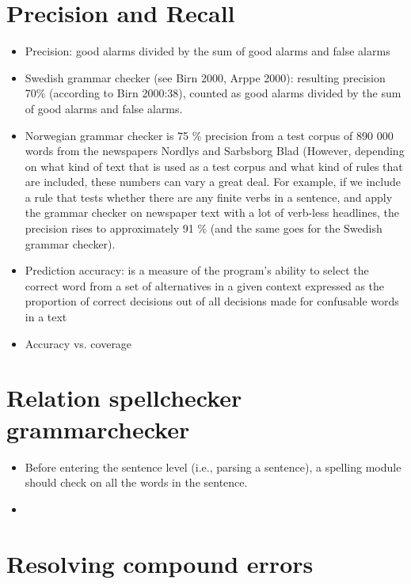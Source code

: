 \documentclass[a4paper,english,12pt]{article}
\begin{document}
\begin{spacing}{1.0}
\section{Precision and Recall}

\begin{itemize}
\item Precision: good alarms divided by the sum of good alarms and false alarms
\item Swedish grammar checker (see Birn 2000, Arppe 2000): resulting precision 70\% (according to Birn 2000:38), counted as good alarms divided by the sum of good alarms and false alarms. 
\item Norwegian grammar checker is 75 \% precision from a test corpus of 890 000 words from the newspapers Nordlys and Sarbsborg Blad \cite{Hagen2001a} (However, depending on what kind of text that is used as a test corpus and what kind of rules that are included, these numbers can vary a great deal. For example, if we include a rule that tests whether there are any finite verbs in a sentence, and apply the grammar checker on newspaper text with a lot of verb-less headlines, the precision rises to approximately 91 \% (and the same goes for the Swedish grammar checker).
\item Prediction accuracy: is a measure of the program's ability to select the correct word from a set of alternatives in a given context expressed as the proportion of correct decisions out of all decisions made for confusable words in a text \cite{Pedler2007} 
\item Accuracy vs. coverage \cite[p.186]{Pedler2007}
\end{itemize}

\section{Relation spellchecker grammarchecker}

\begin{itemize}
\item Before entering the sentence level (i.e., parsing a sentence), a spelling module should check on all the words in the sentence. \cite{Vosse1992}
\item
\end{itemize}

\section{Resolving compound errors}


\end{spacing}
\end{document}
